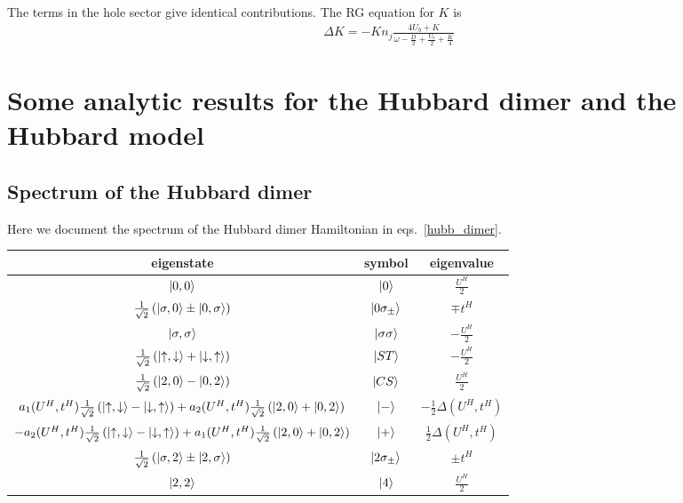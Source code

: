 \documentclass{report}
\numberwithin{equation}{section}
\begin{document}
\begin{appendices}
The terms in the hole sector give identical contributions. The RG equation for \(K\) is
\begin{equation}\begin{aligned}
	\Delta K = -K n_j\frac{4 U_b + K}{\omega - \frac{D}{2} + \frac{U_b}{2} + \frac{K}{4}}
\end{aligned}\end{equation}

\chapter{Some analytic results for the Hubbard dimer and the Hubbard model}
\section{Spectrum of the Hubbard dimer}
Here we document the spectrum of the Hubbard dimer Hamiltonian in eqs.~\ref{hubb_dimer}.
\begin{center}
	\begin{tabular}{|c|c|c|}
	\hline
	eigenstate & symbol & eigenvalue \\
	\hline
	$\ket{0,0}$ & $\ket{0}$ & \( \frac{U^H}{2}\)\\
	$ \frac{1}{\sqrt 2}\left(\ket{\sigma,0} \pm \ket{0,\sigma}\right)$ & $\ket{0\sigma_\pm}$ & \(\mp t^H\)\\
	$\ket{\sigma,\sigma}$ & $\ket{\sigma\sigma}$ & \( -\frac{U^H}{2}\)\\
	$ \frac{1}{\sqrt 2}\left(\ket{\uparrow,\downarrow} + \ket{\downarrow,\uparrow}\right)$ & $\ket{ST}$ & \( -\frac{U^H}{2}\)\\
	$ \frac{1}{\sqrt 2}\left(\ket{2,0} - \ket{0,2}\right)$ & $\ket{CS}$ & \( \frac{U^H}{2}\)\\
	$a_1(U^H, t^H) \frac{1}{\sqrt 2}\left(\ket{\uparrow,\downarrow} - \ket{\downarrow,\uparrow}\right) + a_2(U^H, t^H)\frac{1}{\sqrt 2}\left(\ket{2,0} + \ket{0,2}\right)$ & $\ket{-}$ & \(-\frac{1}{2}\Delta(U^H, t^H)\)\\
	$-a_2(U^H, t^H) \frac{1}{\sqrt 2}\left(\ket{\uparrow,\downarrow} - \ket{\downarrow,\uparrow}\right) + a_1(U^H, t^H)\frac{1}{\sqrt 2}\left(\ket{2,0} + \ket{0,2}\right)$ & $\ket{+}$ & \(\frac{1}{2}\Delta(U^H, t^H)\)\\
	$ \frac{1}{\sqrt 2}\left(\ket{\sigma,2} \pm \ket{2,\sigma}\right)$ & $\ket{2\sigma_\pm}$ & \(\pm t^H\)\\
	$\ket{2,2}$ & $\ket{4}$ & \( \frac{U^H}{2}\)\\
\hline
	\end{tabular}
	\label{hubb_dim_spectrum}
\end{center}


\end{appendices}
\end{document}
